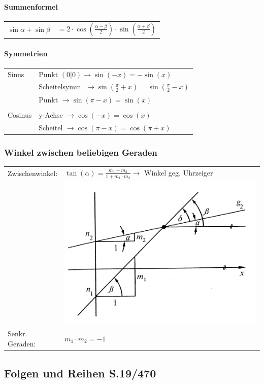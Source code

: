 			\paragraph{Summenformel}
				\begin{tabular}{ll}
					$\sin\alpha + \sin\beta$ & $= 2 \cdot \cos(\frac{\alpha - \beta}{2}) \cdot \sin(\frac{\alpha + \beta}{2})$ \\
				\end{tabular}
			
			\paragraph{Symmetrien} 
				\begin{tabular}{ll}
					Sinus & Punkt $(0|0) \rightarrow \sin(-x) = - \sin(x)$ \\
					      & Scheitelsymm. $\rightarrow \sin(\frac{\pi}{2} + x) = \sin(\frac{\pi}{2} - x)$ \\
					      & Punkt $\rightarrow \sin(\pi - x) = \sin(x)$ \\
					\\
					Cosinus & y-Achse $\rightarrow \cos(-x) = \cos(x)$ \\
					        & Scheitel $\rightarrow \cos(\pi - x) = \cos(\pi + x)$ \\		
				\end{tabular}
				
		\subsubsection{Winkel zwischen beliebigen Geraden}
			\begin{tabular}{ll}
				Zwischenwinkel: & $\tan(\alpha) = \frac{m_1 - m_2}{1 + m_1 \cdot m_2} \rightarrow$ Winkel geg. Uhrzeiger \\
				                & \includegraphics[width=0.3\linewidth]{Bilder/zwischenwinkel.png}\\
				Senkr. Geraden: & $m_1 \cdot m_2 = -1$ \\
			\end{tabular}
            
	\subsection{Folgen und Reihen S.19/470}
			

